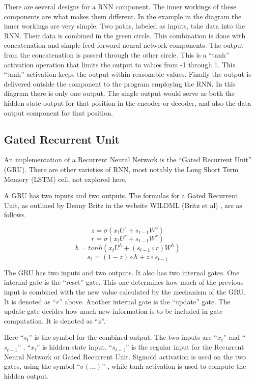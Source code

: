 There are several designs for a RNN component. The inner workings of these components are what makes them different. In the example in the diagram the inner workings are very simple. Two paths, labeled as inputs, take data into the RNN. Their data is combined in the green circle. This combination is done with concatenation and simple feed forward neural network components. The output from the concatenation is passed through the other circle. This is a ``tanh'' activation operation that limits the output to values from -1 through 1. This ``tanh'' activation keeps the output within reasonable values. Finally the output is delivered outside the component to the program employing the RNN. In this diagram there is only one output. The single output would serve as both the hidden state output for that position in the encoder or decoder, and also the data output component for that position.



\subsection{Gated Recurrent Unit}
An implementation of a Recurrent Neural Network is the ``Gated Recurrent Unit'' (GRU). There are other varieties of RNN, most notably the Long Short Term Memory (LSTM) cell, not explored here. 

A \ac{GRU} has two inputs and two outputs. The formulas for a Gated Recurrent Unit, as outlined by Denny Britz in the website WILDML (Britz et al) \cite{2015Britz}, are as follows.

\begin{minipage}{5in}

$$ z =\sigma(x_tU^z + s_{t-1} W^z) $$  
$$ r =\sigma(x_t U^r +s_{t-1} W^r) $$  
$$ h = tanh(x_t U^h + (s_{t-1} \circ r) W^h) $$  
$$ s_t = (1 - z) \circ h + z \circ s_{t-1} $$  

\end{minipage}

\bigskip \bigskip

The GRU has two inputs and two outputs. It also has two internal gates. One internal gate is the ``reset'' gate. This one determines how much of the previous input is combined with the new value calculated by the mechanism of the GRU. It is denoted as ``$r$'' above. Another internal gate is the ``update'' gate. The update gate decides how much new information is to be included in gate computation. It is denoted as ``$z$''.

Here ``$ s_t $'' is the symbol for the combined output. The two inputs are ``$ x_t $'' and ``$ s_{t-1} $'' . ``$ x_t $'' is hidden state input. ``$ s_{t-1} $'' is the regular input for the Recurrent Neural Network or Gated Recurrent Unit. Sigmoid activation is used on the two gates, using the symbol ``$ \sigma(...) $'' , while tanh activation is used to compute the hidden output. 

